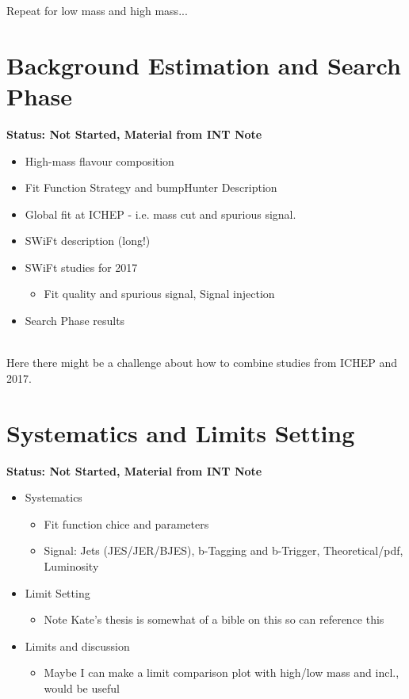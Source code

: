  Repeat for low mass and high mass...

\section{Background Estimation and Search Phase}

\textbf{Status: Not Started, Material from INT Note}


\begin{itemize}
  \item{High-mass flavour composition}
  \item{Fit Function Strategy and  bumpHunter Description}
  \item{Global fit at ICHEP - i.e. mass cut and spurious signal.}
  \item{SWiFt description (long!) }
  \item{SWiFt studies for 2017}
  \begin{itemize}[label={$-$}]
    \item{Fit quality and spurious signal, Signal injection}
  \end{itemize}
  \item{Search Phase results}
\end{itemize}
\noindent\\
Here there might be a challenge about how to combine studies from ICHEP and 2017.    

\section{Systematics and Limits Setting}


\textbf{Status: Not Started, Material from INT Note}

  \begin{itemize}
  \item{Systematics} 
    \begin{itemize}[label={$-$}]
    \item{Fit function chice and parameters}
    \item{Signal: Jets (JES/JER/BJES), b-Tagging and b-Trigger, Theoretical/pdf, Luminosity}
    \end{itemize}
  \item{Limit Setting}
    \begin{itemize}[label={$-$}]
    \item{Note Kate's thesis is somewhat of a bible on this so can reference this}
    \end{itemize}
  \item{Limits and discussion}
    \begin{itemize}[label={$-$}]
    \item{Maybe I can make a limit comparison plot with high/low mass and incl., would be useful}
    \end{itemize}
  \end{itemize}

